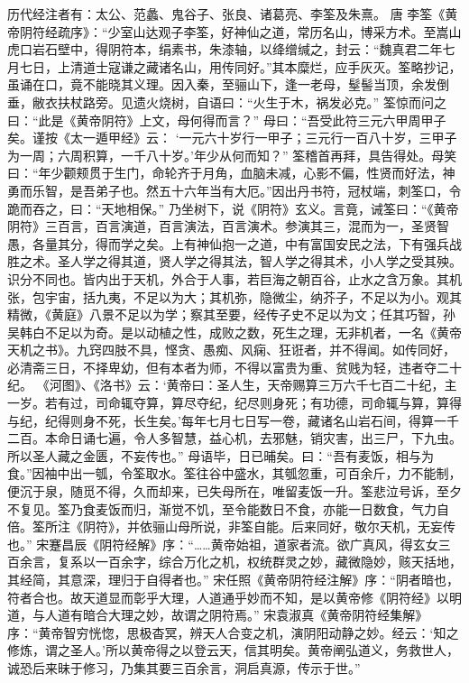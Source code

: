 \documentclass[12pt,UTF8]{ctexbook}
\begin{document}
历代经注者有：太公、范蠡、鬼谷子、张良、诸葛亮、李筌及朱熹。
唐 李筌《黄帝阴符经疏序》：“少室山达观子李筌，好神仙之道，常历名山，博采方术。至嵩山虎口岩石壁中，得阴符本，绢素书，朱漆轴，以绛缯缄之，封云：“魏真君二年七月七日，上清道士寇谦之藏诸名山，用传同好。”其本糜烂，应手灰灭。筌略抄记，虽诵在口，竟不能晓其义理。因入秦，至骊山下，逢一老母，髽髻当顶，余发倒垂，敝衣扶杖路旁。见遗火烧树，自语曰：“火生于木，祸发必克。” 筌惊而问之曰：“此是《黄帝阴符》上文，母何得而言？” 母曰：“吾受此符三元六甲周甲子矣。谨按《太一遁甲经》云： ‘一元六十岁行一甲子；三元行一百八十岁，三甲子为一周；六周积算，一千八十岁。’年少从何而知？” 筌稽首再拜，具告得处。母笑曰：“年少颧颊贯于生门，命轮齐于月角，血脑未减，心影不偏，性贤而好法，神勇而乐智，是吾弟子也。然五十六年当有大厄。”因出丹书符，冠杖端，刺筌口，令跪而吞之，曰：“天地相保。” 乃坐树下，说《阴符》玄义。言竟，诫筌曰：“《黄帝阴符》三百言，百言演道，百言演法，百言演术。参演其三，混而为一，圣贤智愚，各量其分，得而学之矣。上有神仙抱一之道，中有富国安民之法，下有强兵战胜之术。圣人学之得其道，贤人学之得其法，智人学之得其术，小人学之受其殃。识分不同也。皆内出于天机，外合于人事，若巨海之朝百谷，止水之含万象。其机张，包宇宙，括九夷，不足以为大；其机弥，隐微尘，纳芥子，不足以为小。观其精微，《黄庭》八景不足以为学；察其至要，经传子史不足以为文；任其巧智，孙吴韩白不足以为奇。是以动植之性，成败之数，死生之理，无非机者，一名《黄帝天机之书》。九窍四肢不具，悭贪、愚痴、风痫、狂诳者，并不得闻。如传同好，必清斋三日，不择卑幼，但有本者为师，不得以富贵为重、贫贱为轻，违者夺二十纪。
《河图》、《洛书》云：‘黄帝曰：圣人生，天帝赐算三万六千七百二十纪，主一岁。若有过，司命辄夺算，算尽夺纪，纪尽则身死；有功德，司命辄与算，算得与纪，纪得则身不死，长生矣。’每年七月七日写一卷，藏诸名山岩石间，得算一千二百。本命日诵七遍，令人多智慧，益心机，去邪魅，销灾害，出三尸，下九虫。所以圣人藏之金匮，不妄传也。” 母语毕，日已晡矣。曰：“吾有麦饭，相与为食。”因袖中出一瓠，令筌取水。筌往谷中盛水，其瓠忽重，可百余斤，力不能制，便沉于泉，随觅不得，久而却来，已失母所在，唯留麦饭一升。筌悲泣号诉，至夕不复见。筌乃食麦饭而归，渐觉不饥，至令能数日不食，亦能一日数食，气力自倍。筌所注《阴符》，并依骊山母所说，非筌自能。后来同好，敬尔天机，无妄传也。”
宋蹇昌辰《阴符经解》序：“……黄帝始祖，道家者流。欲广真风，得玄女三百余言，复系以一百余字，综合万化之机，权统群灵之妙，藏微隐妙，赅天括地，其经简，其意深，理归于自得者也。”
宋任照《黄帝阴符经注解》序：“阴者暗也，符者合也。故天道显而彰乎大理，人道通乎妙而不知，是以黄帝修《阴符经》以明道，与人道有暗合大理之妙，故谓之阴符焉。”
宋袁淑真《黄帝阴符经集解》序：“黄帝智穷恍惚，思极杳冥，辨天人合变之机，演阴阳动静之妙。经云：‘知之修炼，谓之圣人。’所以黄帝得之以登云天，信其明矣。黄帝阐弘道义，务救世人，诚恐后来昧于修习，乃集其要三百余言，洞启真源，传示于世。”
\end{document}
